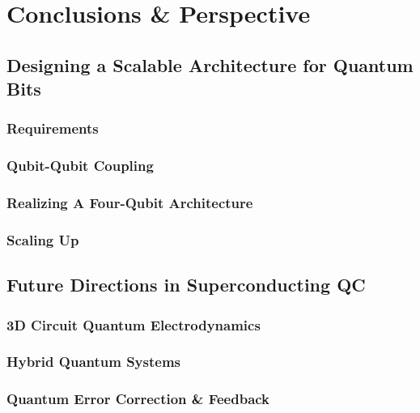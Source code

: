 \chapter{Conclusions \& Perspective}


\section{Designing a Scalable Architecture for Quantum Bits} \label{section:scalable_architecture}

\cite{galiautdinov_resonator/zero-qubit_2011,mariantoni_implementing_2011}

\subsection{Requirements}

\subsection{Qubit-Qubit Coupling}

\subsection{Realizing A Four-Qubit Architecture}

\subsection{Scaling Up}

\section{Future Directions in Superconducting QC}


\subsection{3D Circuit Quantum Electrodynamics}


\subsection{Hybrid Quantum Systems}


\subsection{Quantum Error Correction \& Feedback}


